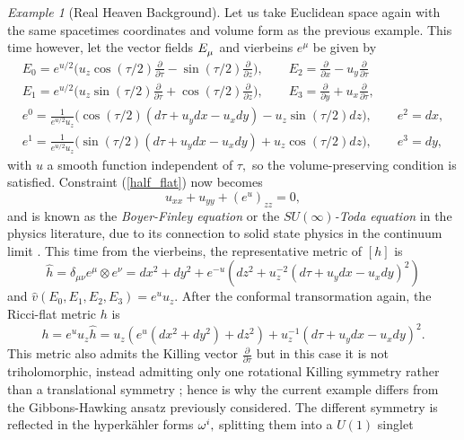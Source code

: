 \documentclass[a4paper,12pt, onecolumn, notitlepage]{article}
\theoremstyle{definition}
\theoremstyle{remark}
\newtheorem{ex}[thm]{Example}
\newcommand{\w}{\omega}
\newcommand{\m}{\mu}
\newcommand{\n}{\nu}
\newcommand{\ddt}[1]{\frac{\partial #1}{\partial \tau}}
\newcommand{\dd}[2]{\frac{\partial #1}{\partial #2}}
\newcommand{\HK}{hyperk\"ahler }
\begin{document}
\begin{ex}[Real Heaven Background]
	Let us take Euclidean space again with the same spacetimes coordinates and volume form as the previous example. This time however, let the vector fields $E\indices{_\m}$ and vierbeins $e^{\m}$ be given by
	\begin{gather*}
		E_{0} = e^{u/2}\bigg(u_{z}\cos(\tau/2)\dd{}{\tau} - \sin(\tau/2)\dd{}{z} \bigg),\qquad E_{2} = \dd{}{x} - u_{y}\dd{}{\tau}\\
		E_{1} = e^{u/2}\bigg(u_{z}\sin(\tau/2)\dd{}{\tau} + \cos(\tau/2)\dd{}{z} \bigg),\qquad E_{3} = \dd{}{y} + u_{x}\dd{}{\tau},\\
		e^{0} = \frac{1}{e^{u/2}u_{z}}\bigg(\cos(\tau/2)(d\tau + u_{y}dx - u_{x}dy) - u_{z}\sin(\tau/2)dz \bigg),\qquad e^{2}=dx,\\
		e^{1} = \frac{1}{e^{u/2}u_{z}}\bigg(\sin(\tau/2)(d\tau + u_{y}dx - u_{x}dy) + u_{z}\cos(\tau/2)dz \bigg),\qquad e^{3}=dy,
	\end{gather*}
	with $u$ a smooth function independent of $\tau,$ so the volume-preserving condition is satisfied. Constraint (\ref{half_flat}) now becomes
	\begin{equation}
	\label{su_infty}
		u_{xx} + u_{yy} + (e^{u})_{zz} = 0,
	\end{equation}
	and is known as the \emph{Boyer-Finley equation} or the $SU(\infty)$\emph{-Toda equation} in the physics literature, due to its connection to solid state physics in the continuum limit \cite{tod_1995, lebrun_1991}. This time from the vierbeins, the representative metric of $[h]$ is
	\begin{equation*}
		\hat{h} = \delta_{\m\n}e^{\m}\otimes e^{\n} = dx^{2}+dy^{2} + e^{-u}(dz^{2} + u_{z}^{-2}(d\tau + u_{y}dx - u_{x}dy)^{2})
	\end{equation*}
	and $\hat{v}(E_{0},E_{1},E_{2},E_{3})=e^{u}u_{z}.$ After the conformal transormation again, the Ricci-flat metric $h$ is
	\begin{equation}
	\label{rh_metric}
	h=e^{u}u_{z}\hat{h}=u_{z}(e^{u}(dx^{2}+dy^{2}) + dz^{2}) + u_{z}^{-1}(d\tau + u_{y}dx - u_{x}dy)^{2}.
	\end{equation}
	This metric also admits the Killing vector $\ddt{}$ but in this case it is not triholomorphic, instead admitting only one rotational Killing symmetry rather than a translational symmetry \cite{park_1990}; hence is why the current example differs from the Gibbons-Hawking ansatz previously considered. The different symmetry is reflected in the \HK forms $\w\indices{^i},$ splitting them into a $U(1)$ singlet

\end{ex}
\end{document}
